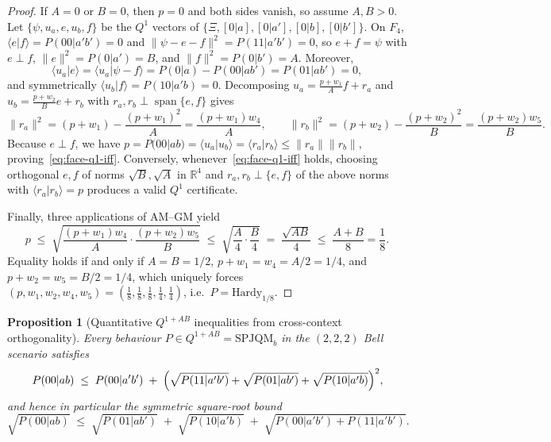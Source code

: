 \documentclass[11pt,a4paper]{article}
\newtheorem{proposition}[theorem]{Proposition}
\theoremstyle{definition}
\theoremstyle{remark}
\newcommand{\SPJQMb}{\mathrm{SPJQM}_b}
\newcommand{\Qone}{Q^{1}}
\newcommand{\QAB}{Q^{1+AB}}
\newcommand{\braket}[2]{\langle #1 | #2 \rangle}
\newcommand{\norm}[1]{\|#1\|}
\begin{document}
\begin{proof}
If $A = 0$ or $B = 0$, then $p = 0$ and both sides vanish, so assume $A, B > 0$. Let $\{\psi, u_a, e, u_b, f\}$ be the $\Qone$ vectors of $\{\Xi, [0|a], [0|a'], [0|b], [0|b']\}$. On $F_4$, $\braket{e}{f} = P(00|a'b') = 0$ and $\norm{\psi - e - f}^2 = P(11|a'b') = 0$, so $e + f = \psi$ with $e \perp f$, $\norm{e}^2 = P(0|a') = B$, and $\norm{f}^2 = P(0|b') = A$. Moreover,
\[
\braket{u_a}{e} = \braket{u_a}{\psi - f} = P(0|a) - P(00|ab') = P(01|ab') = 0,
\]
and symmetrically $\braket{u_b}{f} = P(10|a'b) = 0$. Decomposing $u_a = \frac{p+w_1}{A} f + r_a$ and $u_b = \frac{p+w_2}{B} e + r_b$ with $r_a, r_b \perp \operatorname{span}\{e,f\}$ gives
\[
\norm{r_a}^2 = (p+w_1) - \frac{(p+w_1)^2}{A} = \frac{(p+w_1)w_4}{A}, \qquad
\norm{r_b}^2 = (p+w_2) - \frac{(p+w_2)^2}{B} = \frac{(p+w_2)w_5}{B}.
\]
Because $e \perp f$, we have $p = P(00|ab) = \braket{u_a}{u_b} = \braket{r_a}{r_b} \le \norm{r_a}\norm{r_b}$, proving~\eqref{eq:face-q1-iff}. Conversely, whenever~\eqref{eq:face-q1-iff} holds, choosing orthogonal $e, f$ of norms $\sqrt{B}, \sqrt{A}$ in $\mathbb{R}^4$ and $r_a, r_b \perp \{e,f\}$ of the above norms with $\braket{r_a}{r_b} = p$ produces a valid $\Qone$ certificate.

Finally, three applications of AM--GM yield
\[
p \;\le\; \sqrt{\frac{(p+w_1)w_4}{A}\cdot\frac{(p+w_2)w_5}{B}}
\;\le\; \sqrt{\frac{A}{4}\cdot\frac{B}{4}}
\;=\; \frac{\sqrt{AB}}{4}
\;\le\; \frac{A+B}{8} = \frac{1}{8}.
\]
Equality holds if and only if $A = B = 1/2$, $p+w_1 = w_4 = A/2 = 1/4$, and $p+w_2 = w_5 = B/2 = 1/4$, which uniquely forces $(p, w_1, w_2, w_4, w_5) = (\tfrac{1}{8}, \tfrac{1}{8}, \tfrac{1}{8}, \tfrac{1}{4}, \tfrac{1}{4})$, i.e.\ $P = \mathrm{Hardy}_{1/8}$.
\end{proof}

\begin{proposition}[Quantitative $\QAB$ inequalities from cross-context orthogonality]
\label{prop:qab-bound}
Every behaviour $P \in \QAB = \SPJQMb$ in the $(2,2,2)$ Bell scenario satisfies
\begin{equation}\label{eq:qab-bound-orth}
P(00|ab) \;\le\; P(00|a'b') \;+\; \Bigl(\sqrt{P(11|a'b')} + \sqrt{P(01|ab')} + \sqrt{P(10|a'b)}\Bigr)^2,
\end{equation}
and hence in particular the symmetric square-root bound
\begin{equation}\label{eq:qab-bound}
\sqrt{P(00|ab)} \;\le\; \sqrt{P(01|ab')} \;+\; \sqrt{P(10|a'b)} \;+\; \sqrt{P(00|a'b') + P(11|a'b')}.
\end{equation}
\end{proposition}
\end{document}
